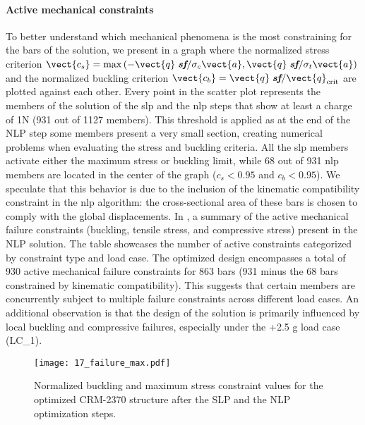 \paragraph{Active mechanical constraints}
To better understand which mechanical phenomena is the most constraining for the bars of the solution, we present in  a graph where the normalized stress criterion $\vect{c_s}=\max{\left(-\vect{q} \; \textit{\textbf{sf}}/\sigma_c \vect{a},\vect{q} \; \textit{\textbf{sf}}/\sigma_t \vect{a}\right)}$ and the normalized buckling criterion $\vect{c_b}=\vect{q}\; \textit{\textbf{sf}}/\vect{q}_{\text{crit}}$ are plotted against each other. Every point in the scatter plot represents the members of the solution of the \gls{slp} and the \gls{nlp} steps that show at least a charge of 1N (931 out of 1127 members). This threshold is applied as at the end of the NLP step some members present a very small section, creating numerical problems when evaluating the stress and buckling criteria. All the \gls{slp} members activate either the maximum stress or buckling limit, while 68 out of 931 \gls{nlp} members are located in the center of the graph ($c_s<0.95$ and $c_b<0.95$). We speculate that this behavior is due to the inclusion of the kinematic compatibility constraint in the \gls{nlp} algorithm: the cross-sectional area of these bars is chosen to comply with the global displacements. In , a summary of the active mechanical failure constraints (buckling, tensile stress, and compressive stress) present in the NLP solution. The table showcases the number of active constraints categorized by constraint type and load case. The optimized design encompasses a total of 930 active mechanical failure constraints for 863 bars (931 minus the 68 bars constrained by kinematic compatibility). This suggests that certain members are concurrently subject to multiple failure constraints across different load cases. An additional observation is that the design of the solution is primarily influenced by local buckling and compressive failures, especially under the +2.5 g load case (LC\_1).

\begin{figure}
    \centering
    \texttt{[image: 17\_failure\_max.pdf]}
     \caption{Normalized buckling and maximum stress constraint values for the optimized CRM-2370 structure after the SLP and the NLP optimization steps.}
    \label{fig:fail-crm}
\end{figure}


